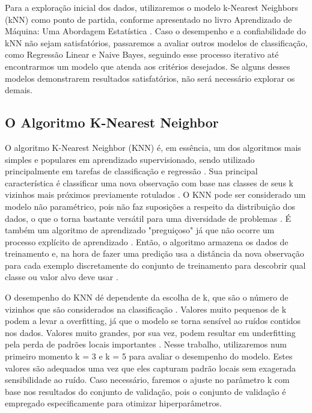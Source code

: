 Para a exploração inicial dos dados, utilizaremos o modelo k-Nearest Neighbors (kNN) como ponto de partida, conforme apresentado no livro Aprendizado de Máquina: Uma Abordagem Estatística . Caso o desempenho e a confiabilidade do kNN não sejam satisfatórios, passaremos a avaliar outros modelos de classificação, como Regressão Linear e Naive Bayes, seguindo esse processo iterativo até encontrarmos um modelo que atenda aos critérios desejados. Se alguns desses modelos demonstrarem resultados satisfatórios, não será necessário explorar os demais.

\subsection{O Algoritmo K-Nearest Neighbor}
O algoritmo K-Nearest Neighbor (KNN) é, em essência, um dos algoritmos mais simples e populares em aprendizado supervisionado, sendo utilizado principalmente em tarefas de classificação e regressão \cite{zhang2016}. Sua principal característica é classificar uma nova observação com base nas classes de seus k vizinhos mais próximos previamente rotulados \cite{zhang2016}. O KNN pode ser considerado um modelo não paramétrico, pois não faz suposições a respeito da distribuição dos dados, o que o torna bastante versátil para uma diversidade de problemas \cite{zhang2016}. É também um algoritmo de aprendizado "preguiçoso" já que não ocorre um processo explícito de aprendizado \cite{zhang2016}.  Então, o algoritmo armazena os dados de treinamento e, na hora de fazer uma predição usa a distância da nova observação para cada exemplo discretamente do conjunto de treinamento para descobrir qual classe ou valor alvo deve usar \cite{zhang2016}.

O desempenho do KNN dé dependente da escolha de k, que são o número de vizinhos que são considerados na classificação \cite{zhang2016}. Valores muito pequenos de k podem a levar a overfitting, já que o modelo se torna sensível ao ruídos contidos nos dados. Valores muito grandes, por sua vez, podem resultar em underfitting pela perda de padrões locais importantes \cite{elkan2011}. Nesse trabalho, utilizaremos num primeiro momento k = 3 e k = 5 para avaliar o desempenho do modelo. Estes valores são adequados uma vez que eles capturam padrão locais sem exagerada sensibilidade ao ruído. Caso necessário, faremos o ajuste no parâmetro k com base nos resultados do conjunto de validação, pois o conjunto de validação é empregado especificamente para otimizar hiperparâmetros.


